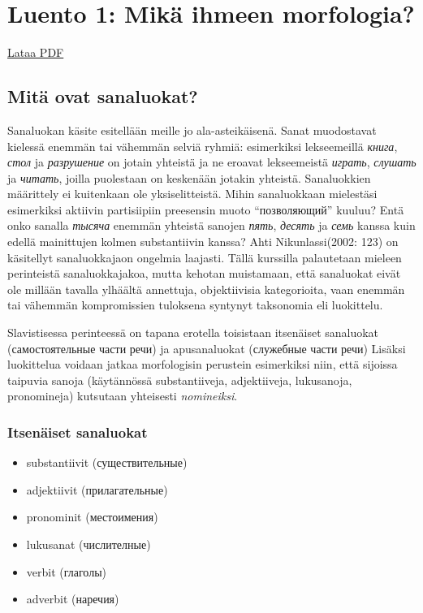 \section{Luento 1: Mikä ihmeen
morfologia?}\label{luento-1-mikuxe4-ihmeen-morfologia}

\href{materiaalit/luento1.pdf}{Lataa PDF}

\subsection{Mitä ovat sanaluokat?}\label{mituxe4-ovat-sanaluokat}

Sanaluokan käsite esitellään meille jo ala-asteikäisenä. Sanat
muodostavat kielessä enemmän tai vähemmän selviä ryhmiä: esimerkiksi
lekseemeillä \emph{книга}, \emph{стол} ja \emph{разрушение} on jotain
yhteistä ja ne eroavat lekseemeistä \emph{играть}, \emph{слушать} ja
\emph{читать}, joilla puolestaan on keskenään jotakin yhteistä.
Sanaluokkien määrittely ei kuitenkaan ole yksiselitteistä. Mihin
sanaluokkaan mielestäsi esimerkiksi aktiivin partisiipiin preesensin
muoto ``позволяющий'' kuuluu? Entä onko sanalla \emph{тысяча} enemmän
yhteistä sanojen \emph{пять}, \emph{десять} ja \emph{семь} kanssa kuin
edellä mainittujen kolmen substantiivin kanssa? Ahti Nikunlassi(2002:
123) on käsitellyt sanaluokkajaon ongelmia laajasti. Tällä kurssilla
palautetaan mieleen perinteistä sanaluokkajakoa, mutta kehotan
muistamaan, että sanaluokat eivät ole millään tavalla ylhäältä
annettuja, objektiivisia kategorioita, vaan enemmän tai vähemmän
kompromissien tuloksena syntynyt taksonomia eli luokittelu.

Slavistisessa perinteessä on tapana erotella toisistaan itsenäiset
sanaluokat (самостоятельные части речи) ja apusanaluokat (служебные
части речи) Lisäksi luokittelua voidaan jatkaa morfologisin perustein
esimerkiksi niin, että sijoissa taipuvia sanoja (käytännössä
substantiiveja, adjektiiveja, lukusanoja, pronomineja) kutsutaan
yhteisesti \emph{nomineiksi}.

\subsubsection{Itsenäiset sanaluokat}\label{itsenuxe4iset-sanaluokat}

\begin{itemize}
\itemsep1pt\parskip0pt
\item
  substantiivit (существительные)
\item
  adjektiivit (прилагательные)
\item
  pronominit (местоимения)
\item
  lukusanat (числителные)
\item
  verbit (глаголы)
\item
  adverbit (наречия)
\end{itemize}

